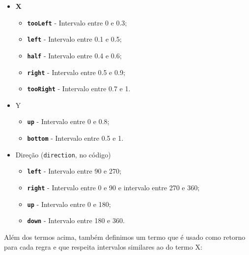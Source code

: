\documentclass{article}
\begin{document}
        \begin{itemize}
            \item \textbf{X}
                \begin{itemize}
                    \item \texttt{\textbf{tooLeft}} - Intervalo entre 0 e 0.3;
                    \item \texttt{\textbf{left}} - Intervalo entre 0.1 e 0.5;
                    \item \texttt{\textbf{half}} - Intervalo entre 0.4 e 0.6;
                    \item \texttt{\textbf{right}} - Intervalo entre 0.5 e 0.9;
                    \item \texttt{\textbf{tooRight}} - Intervalo entre 0.7 e 1.
                \end{itemize}
            
            \item Y 
                \begin{itemize}
                    \item \texttt{\textbf{up}} - Intervalo entre 0 e 0.8;
                    \item \texttt{\textbf{bottom}} - Intervalo entre 0.5 e 1.
                \end{itemize}

            \item Direção (\texttt{direction}, no código)
                \begin{itemize}
                    \item \texttt{\textbf{left}} - Intervalo entre 90 e 270;
                    \item \texttt{\textbf{right}} - Intervalo entre 0 e 90 e
                        intervalo entre 270 e 360;
                    \item \texttt{\textbf{up}} - Intervalo entre 0 e 180;
                    \item \texttt{\textbf{down}} - Intervalo entre 180 e 360.
                \end{itemize}
        \end{itemize}
        
        Além dos termos acima, também definimos um termo que é usado como
        retorno para cada regra e que respeita intervalos similares ao do termo
        X:
        
\end{document}
